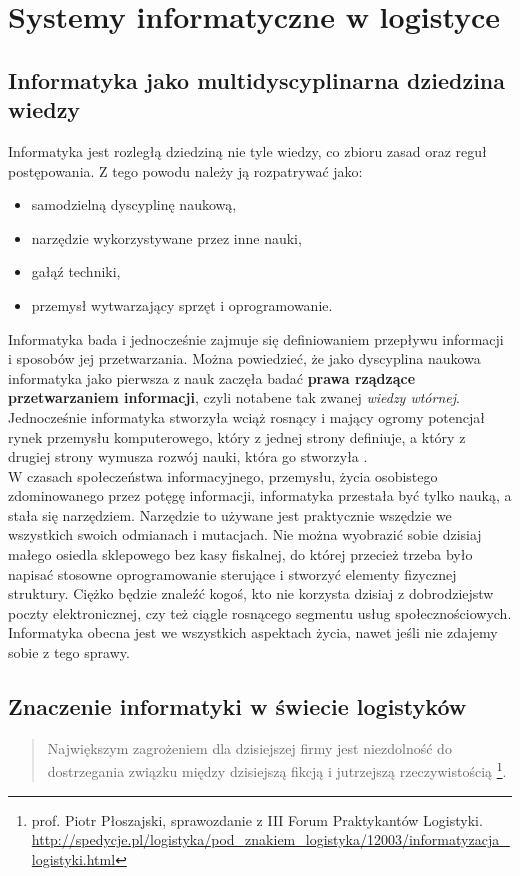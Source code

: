 \chapter{Systemy informatyczne w logistyce}
\label{c3:c3}

\section{Informatyka jako multidyscyplinarna dziedzina wiedzy}
	Informatyka jest rozległą dziedziną nie tyle wiedzy, co zbioru zasad oraz reguł postępowania.
	Z tego powodu należy ją rozpatrywać jako:
	\begin{itemize}
		\item samodzielną dyscyplinę naukową,
		\item narzędzie wykorzystywane przez inne nauki,
		\item gałąź techniki,
		\item przemysł wytwarzający sprzęt i oprogramowanie.
	\end{itemize}	 

	Informatyka bada i jednocześnie zajmuje się definiowaniem przepływu informacji i sposobów jej przetwarzania. 
	Można powiedzieć, że jako dyscyplina naukowa informatyka 
	jako pierwsza z nauk zaczęła badać \textbf{prawa rządzące przetwarzaniem informacji}, czyli notabene
	tak zwanej \emph{wiedzy wtórnej}. Jednocześnie informatyka stworzyła wciąż rosnący i mający 
	ogromy potencjał rynek przemysłu komputerowego, który z jednej strony definiuje, a który 
	z drugiej strony wymusza rozwój nauki, która go stworzyła \cite{it_definition}.\\
	
	W czasach społeczeństwa informacyjnego, przemysłu, życia osobistego zdominowanego przez potęgę informacji, informatyka
	przestała być tylko nauką, a stała się narzędziem. Narzędzie to używane jest praktycznie wszędzie
	we wszystkich swoich odmianach i mutacjach. Nie można wyobrazić sobie dzisiaj małego osiedla sklepowego bez
	kasy fiskalnej, do której przecież trzeba było napisać stosowne oprogramowanie sterujące i stworzyć
	elementy fizycznej struktury. Ciężko będzie znaleźć kogoś, kto nie korzysta dzisiaj z dobrodziejstw poczty
	elektronicznej, czy też ciągle rosnącego segmentu usług społecznościowych. Informatyka obecna jest we
	wszystkich aspektach życia, nawet jeśli nie zdajemy sobie z tego sprawy.
	
\section{Znaczenie informatyki w świecie logistyków}
	\begin{quote}
		Największym zagrożeniem dla dzisiejszej firmy jest niezdolność do dostrzegania związku
		między dzisiejszą fikcją i jutrzejszą rzeczywistością
		\footnote{prof. Piotr Płoszajski, sprawozdanie z III Forum Praktykantów Logistyki.\\
		\url{http://spedycje.pl/logistyka/pod_znakiem_logistyka/12003/informatyzacja_logistyki.html}}.
	\end{quote}

